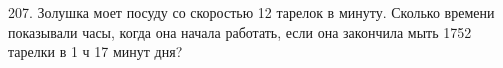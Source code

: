 207. Золушка моет посуду со скоростью 12 тарелок в минуту. Сколько времени показывали часы, когда она начала работать, если она закончила мыть 1752 тарелки в 1 ч 17 минут дня?\\

